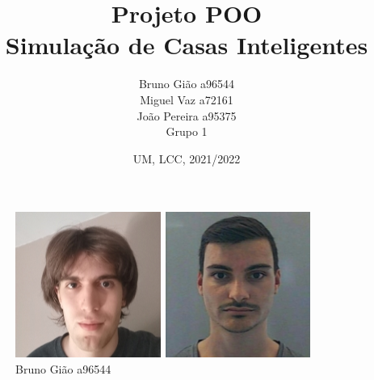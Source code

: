 \documentclass[10pt, a4paper]{article}
\title{Projeto POO\\
        Simulação de Casas Inteligentes}
\author{Bruno Gião a96544 \\ Miguel Vaz a72161 \\ João Pereira a95375 \\ Grupo 1}
\date{UM, LCC, 2021/2022}
\begin{document}
\maketitle
\begin{figure}[!htb]
\begin{minipage}{0.33\textwidth}
        \centering
        \includegraphics[width=\linewidth]{Bruno.png}
        \caption{Bruno Gião a96544}
\end{minipage}
\begin{minipage}{0.33\textwidth}
        \centering
        \includegraphics[width=\linewidth]{Joao.png}

\end{minipage}
\end{figure}
\end{document}
